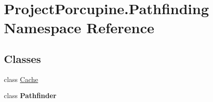 \hypertarget{namespace_project_porcupine_1_1_pathfinding}{}\section{Project\+Porcupine.\+Pathfinding Namespace Reference}
\label{namespace_project_porcupine_1_1_pathfinding}
\subsection*{Classes}
\begin{DoxyCompactItemize}
\item 
class \hyperlink{class_project_porcupine_1_1_pathfinding_1_1_cache}{Cache}
\item 
class {\bfseries Pathfinder}
\end{DoxyCompactItemize}
